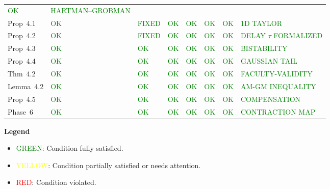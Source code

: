 \begin{tabular}{lp{1.5cm}p{1.5cm}p{1.5cm}p{1.5cm}p{1.5cm}p{1.5cm}p{1.6cm}}
\textcolor{green}{OK} &
\textcolor{green}{HARTMAN--GROBMAN} \\
Prop~4.1 &
\textcolor{green}{OK} &
\textcolor{green}{FIXED} &
\textcolor{green}{OK} &
\textcolor{green}{OK} &
\textcolor{green}{OK} &
\textcolor{green}{OK} &
\textcolor{green}{1D TAYLOR} \\
Prop~4.2 &
\textcolor{green}{OK} &
\textcolor{green}{FIXED} &
\textcolor{green}{OK} &
\textcolor{green}{OK} &
\textcolor{green}{OK} &
\textcolor{green}{OK} &
\textcolor{green}{DELAY $\tau$ FORMALIZED} \\
Prop~4.3 &
\textcolor{green}{OK} &
\textcolor{green}{OK} &
\textcolor{green}{OK} &
\textcolor{green}{OK} &
\textcolor{green}{OK} &
\textcolor{green}{OK} &
\textcolor{green}{BISTABILITY} \\
Prop~4.4 &
\textcolor{green}{OK} &
\textcolor{green}{OK} &
\textcolor{green}{OK} &
\textcolor{green}{OK} &
\textcolor{green}{OK} &
\textcolor{green}{OK} &
\textcolor{green}{GAUSSIAN TAIL} \\
Thm~4.2 &
\textcolor{green}{OK} &
\textcolor{green}{OK} &
\textcolor{green}{OK} &
\textcolor{green}{OK} &
\textcolor{green}{OK} &
\textcolor{green}{OK} &
\textcolor{green}{FACULTY-VALIDITY} \\
Lemma~4.2 &
\textcolor{green}{OK} &
\textcolor{green}{OK} &
\textcolor{green}{OK} &
\textcolor{green}{OK} &
\textcolor{green}{OK} &
\textcolor{green}{OK} &
\textcolor{green}{AM-GM INEQUALITY} \\
Prop~4.5 &
\textcolor{green}{OK} &
\textcolor{green}{OK} &
\textcolor{green}{OK} &
\textcolor{green}{OK} &
\textcolor{green}{OK} &
\textcolor{green}{OK} &
\textcolor{green}{COMPENSATION} \\
Phase~6 &
\textcolor{green}{OK} &
\textcolor{green}{OK} &
\textcolor{green}{OK} &
\textcolor{green}{OK} &
\textcolor{green}{OK} &
\textcolor{green}{OK} &
\textcolor{green}{CONTRACTION MAP} \\
\bottomrule
\end{tabular}

\vspace{2mm}

\noindent\textbf{Legend}
\begin{itemize}[nosep]
\item \textcolor{green}{GREEN}: Condition fully satisfied.
\item \textcolor{yellow}{YELLOW}: Condition partially satisfied or needs attention.
\item \textcolor{red}{RED}: Condition violated.
\end{itemize}

